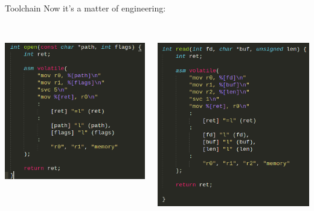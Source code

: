 \documentclass[12pt,aspectratio=169]{beamer}
\begin{document}
\begin{frame}{Toolchain}
Now it's a matter of engineering: \\~\\
\begin{columns}
	\begin{column}{0.33\textwidth}
		\includegraphics[width=\textwidth]{media/syscall_open}
	\end{column}
	\begin{column}{0.33\textwidth}
		\includegraphics[width=\textwidth]{media/syscall_read}

\end{column}
\end{columns}
\end{frame}
\end{document}
